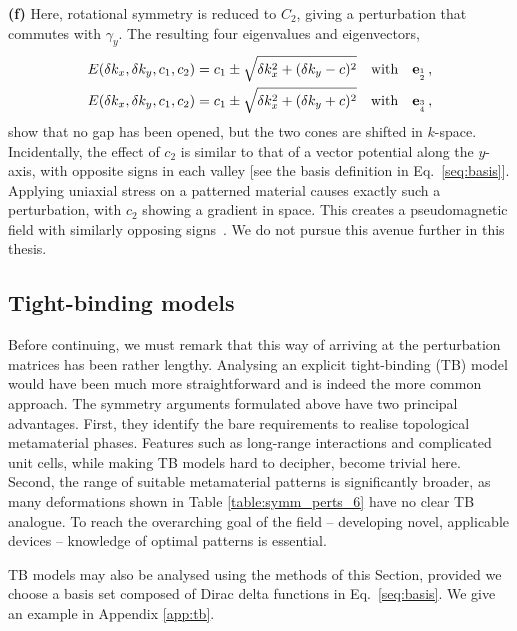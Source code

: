 \textbf{(f)} Here, rotational symmetry is reduced to $C_2$, giving a perturbation that commutes with $\gamma_y$. The resulting four eigenvalues and eigenvectors,
\begin{equation}
\begin{aligned}
E(\delta k_x, \delta k_y, c_1, c_2) &= c_1 \pm \sqrt{\delta k_x^2 + (\delta k_y - c)^2} \quad \text{with} \quad \vb{e}_{_{2}^{1}} \,, \\
E(\delta k_x, \delta k_y, c_1, c_2) &= c_1 \pm \sqrt{\delta k_x^2 + (\delta k_y + c)^2} \quad \text{with} \quad \vb{e}_{_{4}^{3}} \,,
\end{aligned}
\end{equation}
show that no gap has been opened, but the two cones are shifted in $k$-space. Incidentally, the effect of $c_2$ is similar to that of a vector potential along the $y$-axis, with opposite signs in each valley [see the basis definition in Eq.~\eqref {seq:basis}]. Applying uniaxial stress on a patterned material causes exactly such a perturbation, with $c_2$ showing a gradient in space. This creates a pseudomagnetic field with similarly opposing signs~\cite{Jamadi_2020, Guglielmon_2021}. We do not pursue this avenue further in this thesis.


\subsection{Tight-binding models}

Before continuing, we must remark that this way of arriving at the perturbation matrices has been rather lengthy. Analysing an explicit tight-binding (TB) model would have been much more straightforward and is indeed the more common approach. The symmetry arguments formulated above have two principal advantages. First, they identify the bare requirements to realise topological metamaterial phases. Features such as long-range interactions and complicated unit cells, while making TB models hard to decipher, become trivial here. Second, the range of suitable metamaterial patterns is significantly broader, as many deformations shown in Table \ref{table:symm_perts_6} have no clear TB analogue. To reach the overarching goal of the field -- developing novel, applicable devices -- knowledge of optimal patterns is essential.

TB models may also be analysed using the methods of this Section, provided we choose a basis set composed of Dirac delta functions in Eq.~\eqref{seq:basis}. We give an example in Appendix \ref{app:tb}. 

